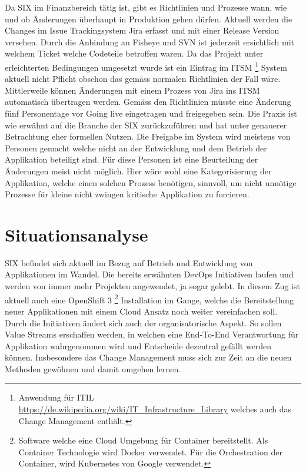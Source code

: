 Da SIX im Finanzbereich tätig ist, gibt es Richtlinien und Prozesse wann, wie und ob Änderungen überhaupt in Produktion gehen dürfen. Aktuell werden die Changes im Issue Trackingsystem Jira erfasst und mit einer Release Version versehen. Durch die Anbindung an Fisheye und SVN ist jederzeit ersichtlich mit welchem Ticket welche Codeteile betroffen waren. Da das Projekt unter erleichterten Bedingungen umgesetzt wurde ist ein Eintrag im ITSM \footnote{Anwendung für ITIL \url{https://de.wikipedia.org/wiki/IT_Infrastructure_Library} welches auch das Change Management enthält.} System aktuell nicht Pflicht obschon das gemäss normalen Richtlinien der Fall wäre. Mittlerweile können Änderungen mit einem Prozess von Jira ins ITSM automatisch übertragen werden.
Gemäss den Richtlinien müsste eine Änderung fünf Personentage vor Going live eingetragen und freigegeben sein. Die Praxis ist wie erwähnt auf die Branche der SIX zurückzuführen und hat unter genauerer Betrachtung eher formellen Nutzen. Die Freigabe im System wird meistens von Personen gemacht welche nicht an der Entwicklung und dem Betrieb der Applikation beteiligt sind. Für diese Personen ist eine Beurteilung der Änderungen meist nicht möglich. Hier wäre wohl eine Kategorisierung der Applikation, welche einen solchen Prozess benötigen, sinnvoll, um nicht unnötige Prozesse für kleine nicht zwingen kritische Applikation zu forcieren.

\section{Situationsanalyse}

SIX befindet sich aktuell im Bezug auf Betrieb und Entwicklung von Applikationen im Wandel. Die bereits erwähnten DevOps Initiativen laufen und werden von immer mehr Projekten angewendet, ja sogar gelebt. In diesem Zug ist aktuell auch eine OpenShift 3 \footnote{Software welche eine Cloud Umgebung für Container bereitstellt. Als Container Technologie wird Docker verwendet. Für die Orchestration der Container, wird Kubernetes von Google verwendet.} Installation im Gange, welche die Bereitstellung neuer Applikationen mit einem Cloud Ansatz noch weiter vereinfachen soll.
Durch die Initiativen ändert sich auch der organisatorische Aspekt. So sollen Value Streams erschaffen werden, in welchen eine End-To-End Verantwortung für Applikation wahrgenommen wird und Entscheide dezentral gefällt werden können. Insbesondere das Change Management muss sich zur Zeit an die neuen Methoden gewöhnen und damit umgehen lernen.

